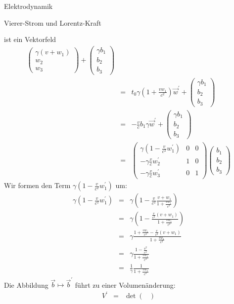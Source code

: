 \begin{chapter}{\titlestr}
\begin{section}{Elektrodynamik}
\begin{subsection}{Vierer-Strom und Lorentz-Kraft}
\begin{subsubsection}{ ist ein Vektorfeld}
\begin{eqnarray*}
\begin{pmatrix}
\gamma \left(v+w_1\right)\\
w_2\\
w_3
\end{pmatrix}+
\begin{pmatrix}
\gamma b_1\\
b_2\\
b_3
\end{pmatrix}\\
&=&t_0\gamma \left(1+\frac{vw_1}{c^2}\right)\vec{w}^\prime
+\begin{pmatrix}
\gamma b_1\\
b_2\\
b_3
\end{pmatrix}\\
&=&-\frac{v}{c}b_1\gamma\vec{w}^\prime
+\begin{pmatrix}
\gamma b_1\\
b_2\\
b_3
\end{pmatrix}\\
&=&\begin{pmatrix}
\gamma\left(1-\frac{v}{c^2}w_1^\prime\right)&0&0\\
-\gamma\frac{v}{c}w_2^\prime&1&0\\
-\gamma\frac{v}{c}w_3^\prime&0&1
\end{pmatrix}\begin{pmatrix}
b_1\\
b_2\\
b_3
\end{pmatrix}
\end{eqnarray*}
Wir formen den Term $\gamma\left(1-\frac{v}{c^2}w_1^\prime\right)$ um:
\begin{eqnarray*}
\gamma\left(1-\frac{v}{c^2}w_1^\prime\right) &=& \gamma\left(1-\frac{v}{c^2}\frac{v+w_1}{1+\frac{vw_1}{c^2}}\right)\\
&=& \gamma\left(1-\frac{\frac{v}{c^2}\left(v+w_1\right)}{1+\frac{vw_1}{c^2}}\right)\\
&=& \gamma\frac{1+\frac{vw_1}{c^2}-\frac{v}{c^2}\left(v+w_1\right)}{1+\frac{vw_1}{c^2}}\\
&=& \gamma\frac{1-\frac{v^2}{c^2}}{1+\frac{vw_1}{c^2}}\\
&=& \frac{1}{\gamma}\frac{1}{1+\frac{vw_1}{c^2}}
\end{eqnarray*}
Die Abbildung $\vec{b}\mapsto\vec{b}^\prime$ führt zu einer Volumenänderung:
\begin{eqnarray*}
V^\prime&=&\det\begin{pmatrix}

\end{pmatrix}
\end{eqnarray*}
\end{subsubsection}
\end{subsection}
\end{section}
\end{chapter}
